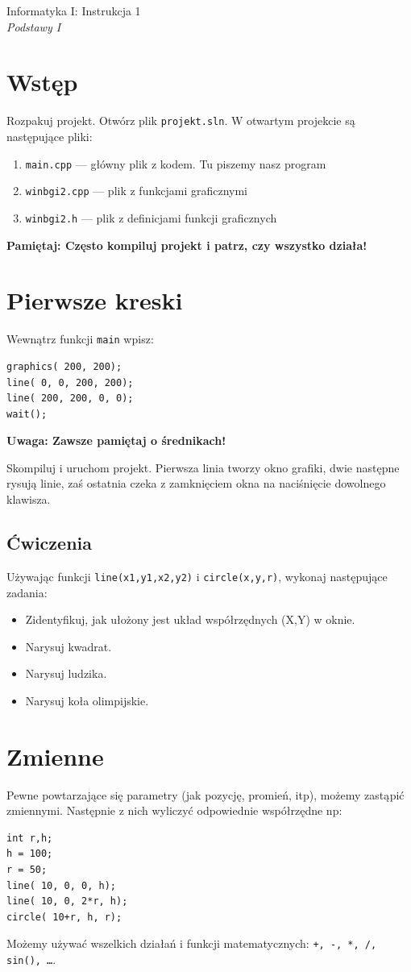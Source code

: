 \documentclass[landscape]{article}
\newcommand{\red}{\color{Red}}
\newcommand{\newtitle}{{\huge\begin{center}{\sc Informatyka I: Instrukcja \labnumber}\\{\it\mytitle}\end{center}}}
\newcommand{\mytitle}{Podstawy I}
\newcommand{\labnumber}{1}
\begin{document}
\newtitle

\section*{Wstęp}

Rozpakuj projekt. Otwórz plik {\tt projekt.sln}. W otwartym projekcie są następujące pliki:
\begin{enumerate}
\item {\tt main.cpp} --- główny plik z kodem. Tu piszemy nasz program
\item {\tt winbgi2.cpp} --- plik z funkcjami graficznymi
\item {\tt winbgi2.h} --- plik z definicjami funkcji graficznych
\end{enumerate}

{\bf{\red Pamiętaj:} Często kompiluj projekt i patrz, czy wszystko działa!}

\section{Pierwsze kreski}

Wewnątrz funkcji {\tt main} wpisz:
\begin{verbatim}
graphics( 200, 200);
line( 0, 0, 200, 200);
line( 200, 200, 0, 0);
wait();
\end{verbatim}
{\bf{\red Uwaga:} Zawsze pamiętaj o średnikach!}

Skompiluj i uruchom projekt. Pierwsza linia tworzy okno grafiki, dwie następne rysują linie, zaś ostatnia czeka z zamknięciem okna na naciśnięcie dowolnego klawisza.

\subsection*{Ćwiczenia}
Używając funkcji {\tt line(x1,y1,x2,y2)} i {\tt circle(x,y,r)}, wykonaj następujące zadania:
\begin{itemize}

\item Zidentyfikuj, jak ułożony jest układ współrzędnych (X,Y) w oknie.
\item Narysuj kwadrat.
\item Narysuj ludzika.
\item Narysuj koła olimpijskie.
\end{itemize}

\section{Zmienne}
Pewne powtarzające się parametry (jak pozycję, promień, itp), możemy zastąpić zmiennymi. Następnie z nich wyliczyć odpowiednie współrzędne np:
\begin{verbatim}
int r,h;
h = 100;
r = 50;
line( 10, 0, 0, h);
line( 10, 0, 2*r, h);
circle( 10+r, h, r);
\end{verbatim}
Możemy używać wszelkich działań i funkcji matematycznych: {\tt +, -, *, /, sin(), \ldots}.
\end{document}
